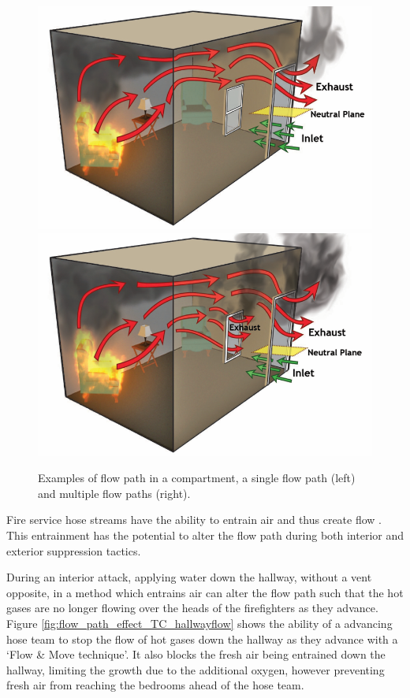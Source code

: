 \documentclass[12pt,oneside]{book}
\begin{document}
\begin{figure}[H]
\centering
\includegraphics[width=.48\textwidth]{../0_Images/Tactical_Considerations/Flow_Path_Effect/flow_path.png}
\includegraphics[width=.48\textwidth]{../0_Images/Tactical_Considerations/Flow_Path_Effect/two_flow_path.png}
\caption[Flow Path]{Examples of flow path in a compartment, a single flow path (left) and multiple flow paths (right).}
\label{fig:flow_path_effect_TC_flow_path}
\end{figure}

Fire service hose streams have the ability to entrain air and thus create flow \cite{Weinchenk_airentrainment}. This entrainment has the potential to alter the flow path during both interior and exterior suppression tactics. 

During an interior attack, applying water down the hallway, without a vent opposite, in a method which entrains air can alter the flow path such that the hot gases are no longer flowing over the heads of the firefighters as they advance. Figure \ref{fig:flow_path_effect_TC_hallwayflow} shows the ability of a advancing hose team to stop the flow of hot gases down the hallway as they advance with a `Flow \& Move technique'. It also blocks the fresh air being entrained down the hallway, limiting the growth due to the additional oxygen, however preventing fresh air from reaching the bedrooms ahead of the hose team. 
\end{document}

